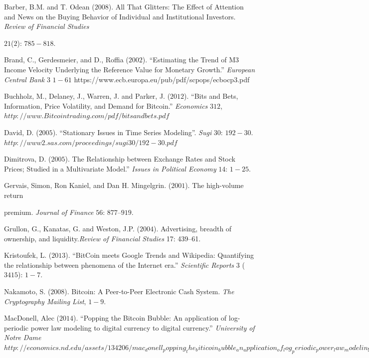\documentclass{article}[10 pt]
\newcommand{\vs}{\vspace{0.1in}}
\begin{document}
\vs

Barber, B.M. and T. Odean ($2008$). All That Glitters: The Effect of
Attention and News on the Buying Behavior of Individual and Institutional
Investors.
\textit{Review of Financial Studies}

$21$($2$): $785-818$. 

\vs

Brand, C., Gerdesmeier, and D., Roffia ($2002$). “Estimating the Trend of
M3 Income Velocity Underlying the Reference Value for Monetary Growth.”
\textit{European Central Bank} $3$ $1-61$
https://www.ecb.europa.eu/pub/pdf/scpops/ecbocp3.pdf

\vs

Buchholz, M., Delaney, J., Warren, J. and Parker, J. ($2012$). “Bits and
Bets, Information, Price Volatility, and Demand for Bitcoin.”
\textit{Economics} $312$,
$http://www.Bitcointrading.com/pdf/bitsandbets.pdf$

\vs

David, D. ($2005$). “Stationary Issues in Time Series Modeling”.
\textit{Sugi} $30$: $192-30$.
$http://www2.sas.com/proceedings/sugi30/192-30.pdf$

\vs

Dimitrova, D. ($2005$). The Relationship between Exchange Rates and Stock
Prices; Studied in a Multivariate Model.” \textit{Issues in Political
Economy} $14$: $1-25$.

\vs

Gervais, Simon, Ron Kaniel, and Dan H. Mingelgrin. ($2001$). The
high-volume return

premium. \textit{Journal of Finance} $56$: $877–919$. 

\vs


Grullon, G., Kanatas, G. and Weston, J.P. ($2004$). Advertising, breadth of
ownership, and liquidity.\textit{Review of Financial Studies} 17: 439–61.

\vs

Kristoufek, L. ($2013$). “BitCoin meets Google Trends and Wikipedia:
Quantifying the relationship between phenomena of the Internet era.”
\textit{Scientific Reports} $3$ ($3415$): $1-7$.

\vs

Nakamoto, S. ($2008$). Bitcoin: A Peer-to-Peer Electronic Cash System.
\textit{The Cryptography Mailing List}, $1-9$.

\vs

MacDonell, Alec ($2014$). “Popping the Bitcoin Bubble: An application of
log-periodic power law modeling to digital currency to digital currency.”
\textit{University of Notre Dame}
$http://economics.nd.edu/assets/134206/mac_donell_popping_the_biticoin_bubble_an_application_of_log_periodic_power_law_modeling_to_digital_currency.pdf$
\end{document}
